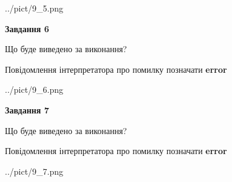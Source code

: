 \documentclass[10pt, ukrainian]{article}
\begin{document}
{\begin {large}
\begin{center}
	{../pict/9_5.png}
\end{center}
\newpage

{\begin {center}\textbf{Завдання 6}\end {center}}\par
Що буде виведено за виконання? \par
Повідомлення інтерпретатора про помилку позначати \textbf{error}

\begin{center}
	{../pict/9_6.png}
\end{center}
\newpage

{\begin {center}\textbf{Завдання 7}\end {center}}\par
Що буде виведено за виконання? \par
Повідомлення інтерпретатора про помилку позначати \textbf{error}

\begin{center}
	{../pict/9_7.png}
\end{center}
\newpage

\end {large}}
\end{document}
